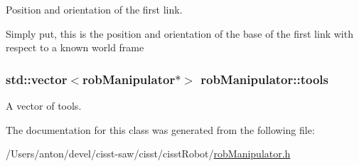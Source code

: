 Position and orientation of the first link. 

Simply put, this is the position and orientation of the base of the first link with respect to a known world frame \hypertarget{classrob_manipulator_ae52a521233de4461f871291dbbe4858a}{}
\subsubsection[{tools}]{\setlength{\rightskip}{0pt plus 5cm}std\+::vector$<${\bf rob\+Manipulator}$\ast$$>$ rob\+Manipulator\+::tools\hspace{0.3cm}{\ttfamily [protected]}}\label{classrob_manipulator_ae52a521233de4461f871291dbbe4858a}


A vector of tools. 



The documentation for this class was generated from the following file\+:\begin{DoxyCompactItemize}
\item 
/\+Users/anton/devel/cisst-\/saw/cisst/cisst\+Robot/\hyperlink{rob_manipulator_8h}{rob\+Manipulator.\+h}\end{DoxyCompactItemize}
